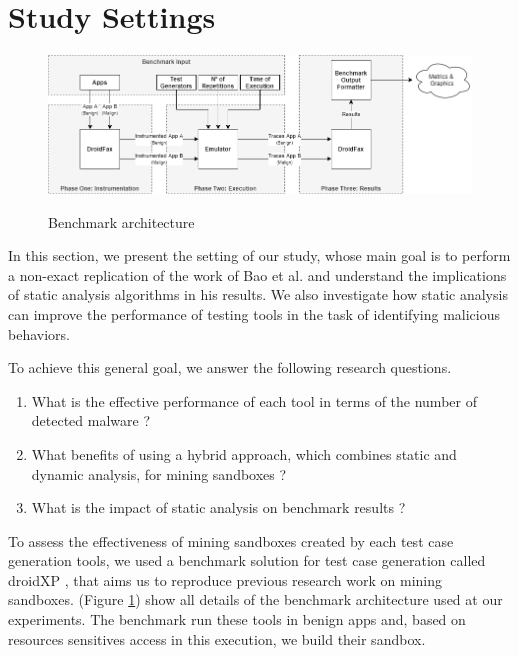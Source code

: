 \section{Study Settings}

\begin{figure}[ht]
  \includegraphics[width=1\textwidth]{images/benchmark3.png}
  \label{benchArq}
  \caption{Benchmark architecture}
  \label{fig:benchArq}
\end{figure}

In this section, we present the setting of our study, whose main goal is to perform a non-exact replication of the work of Bao et al. and understand the implications of static analysis algorithms in his results. We also investigate how static analysis can improve the performance of testing tools in the task of identifying malicious behaviors.

To achieve this general goal, we answer the following research questions. 

\begin{enumerate}[(RQ1)]
\item What is the effective performance of each tool in terms of the number of detected malware ?
\item What benefits of using a hybrid approach, which combines static and dynamic analysis, for mining sandboxes ?
\item What is the impact of static analysis on benchmark results ?
\end{enumerate}

To assess the effectiveness of mining sandboxes created by each test case generation tools, we used a benchmark solution for test case generation called droidXP \cite{DBLP:conf/scam/CostaMCMVBC20}, that aims us to reproduce previous research work on mining sandboxes. (Figure \ref{fig:benchArq}) show all details of the benchmark architecture used at our experiments. The benchmark run these tools in benign apps and, based on resources sensitives access in this execution, we build their sandbox.

